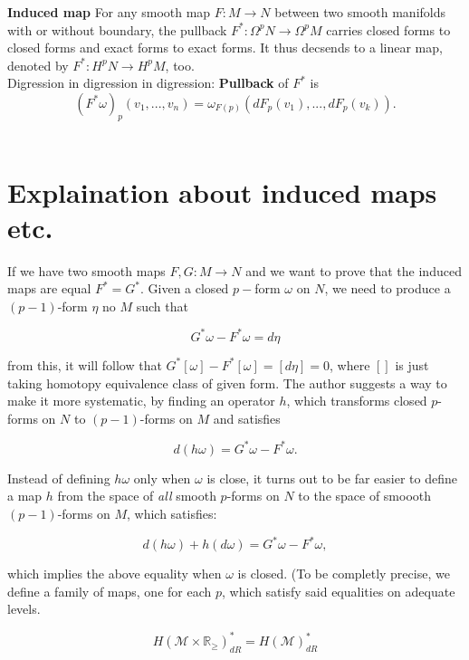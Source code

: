 \documentclass[licencjacka]{pracamgr}
\theoremstyle{definition}
\theoremstyle{definition}
\theoremstyle{plain}
\theoremstyle{plain}
\begin{document}
\textbf{Induced map} For any smooth map $F:
M \rightarrow N$ between two smooth manifolds with or without
boundary, the pullback $F^\ast: \Omega^p N \rightarrow \Omega^p M$
carries closed forms to closed forms and exact forms to exact
forms. It thus decsends to a linear map, denoted by $F^\ast: H^p N
\rightarrow H^p M$, too. \\

Digression in digression in digression: \textbf{Pullback} of $F^\ast$ is
\[
    (F^\ast \omega)_p(v_1, ..., v_n) =
        \omega_{F(p)}(dF_p(v_1), ..., dF_p(v_k)).
\] \\


\section{Explaination about induced maps etc.}

If we have two smooth maps $F, G:
M \rightarrow N$ and we want to prove that the induced maps are equal
$F^\ast = G^\ast$. Given a closed $p-$form $\omega$ on $N$, we need to
produce a $(p-1)$-form $\eta$ no $M$ such that

\[
    G^\ast \omega - F^\ast \omega = d\eta
\]

from this, it will follow that $ G^\ast [\omega] - F^\ast [\omega] =
[d\eta] = 0$, where $[]$ is just taking homotopy equivalence class
of given form. The author suggests a way to make it more systematic,
by finding an operator $h$, which transforms closed $p$-forms on $N$
to $(p-1)$-forms on $M$ and satisfies

\[
    d(h\omega) = G^\ast \omega - F^\ast \omega.
\]

Instead of defining $h\omega$ only when $\omega$ is close, it turns
out to be far easier to define a map $h$ from the space of
\textit{all} smooth $p$-forms on $N$ to the space of smoooth
$(p-1)$-forms on $M$, which satisfies:

\[
    d(h\omega) + h(d\omega) = G^\ast \omega - F^\ast \omega ,
\]

which implies the above equality when $\omega$ is closed. (To be
completly precise, we define a family of maps, one for each $p$, which
satisfy said equalities on adequate levels.

\[
    H(\mathcal{M} \times \mathbb{R}_{\geq})_{dR}^\ast = H(\mathcal{M})_{dR}^\ast
\]
\end{document}

